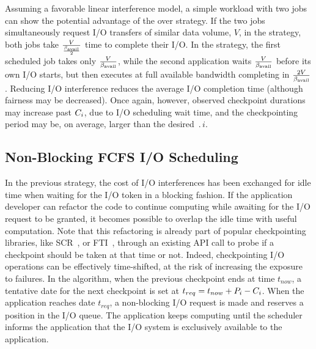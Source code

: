 Assuming a favorable linear interference model, a simple workload with two jobs can
show the potential advantage of the \fifoblock over \nocoop strategy.  If the two
jobs simultaneously request I/O transfers of similar data volume, $V$, in the \nocoop
strategy, both jobs take $\frac{V}{\frac{\beta_{\text{avail}}}{2}}$ time to complete their I/O.
In the \fifoblock strategy, the first scheduled job takes only
$\frac{V}{\beta_{\text{avail}}}$, while the second application waits $\frac{V}{\beta_{\text{avail}}}$
before its own I/O starts, but then executes at full available bandwidth completing
in $\frac{2V}{\beta_{\text{avail}}}$.  Reducing I/O interference reduces the average I/O
completion time (although fairness may be decreased).  Once again, however, observed
checkpoint durations may increase past $C_{i}$, due to I/O scheduling wait time,
and the checkpointing period may be, on average, larger than the desired
$\period{i}$.


\subsection{Non-Blocking \fifononblock FCFS I/O Scheduling}
\label{sec:fcfsnonblock}

In the previous strategy, the cost of I/O interferences has been
exchanged for idle time when waiting for the I/O token in a blocking
fashion. If the application developer can refactor the code
to continue computing while awaiting for the I/O request to be granted,
it becomes possible to overlap the idle time with useful computation.
Note that this refactoring is already part of popular checkpointing
libraries, like SCR~\cite{Moody10_SCR}, or FTI~\cite{Bautista-Gomez11_FTI}, through an
existing API call to probe if a checkpoint should be taken at that time or not.
Indeed, checkpointing I/O operations can
be effectively time-shifted, at the risk of increasing the exposure to failures.
 In the \fifononblock algorithm, when the previous checkpoint ends at time $t_{now}$,
 a tentative date for the next checkpoint is set at $t_{req}=t_{now}+P_{i}-C_{i}$.
 When the application reaches date $t_{req}$, a non-blocking I/O request
is made and reserves a position in the
I/O queue. The application keeps computing until the
scheduler informs the application that the I/O system is exclusively
available to the application.

